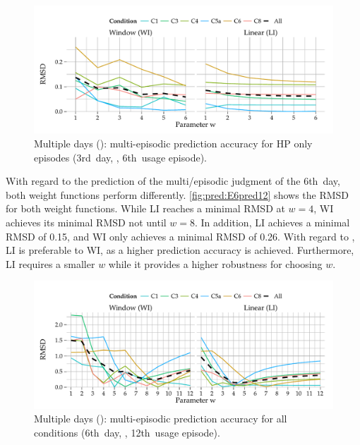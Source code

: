 \begin{figure}[ht!]
	\centering
\begin{knitrout}
\color{fgcolor}
\includegraphics[width=\maxwidth]{figure/plotE6BASE-1} 

\end{knitrout}
	\caption[Multiple days (): multi-episodic prediction accuracy after the 3rd~day (\acs{HP} only)]{Multiple days (): multi-episodic prediction accuracy for \ac{HP} only episodes (3rd~day, \ie, 6th~usage episode).}
	\label{fig:pred:E6pred6}
\end{figure}

With regard to the prediction of the multi\-/episodic judgment of the 6th~day, both weight functions perform differently.
\autoref{fig:pred:E6pred12} shows the \ac{RMSD} for both weight functions.
While LI reaches a minimal \ac{RMSD} at $\mathit{w}=4$, WI achieves its minimal \ac{RMSD} not until $\mathit{w}=8$.
In addition, LI achieves a minimal \ac{RMSD} of 0.15, and WI only achieves a minimal \ac{RMSD} of
0.26.
With regard to , LI is preferable to WI, as a higher prediction accuracy is achieved.
Furthermore, LI requires a smaller $\mathit{w}$ while it provides a higher robustness for choosing $\mathit{w}$.

\begin{figure}[b]
	\centering
\begin{knitrout}
\color{fgcolor}
\includegraphics[width=\maxwidth]{figure/plotE6PRED-1} 

\end{knitrout}
	\caption[Multiple days (): multi-episodic prediction accuracy after the 6th~day]{Multiple days (): multi-episodic prediction accuracy for all conditions (6th~day, \ie, 12th~usage episode).}
	\label{fig:pred:E6pred12}
\end{figure}

